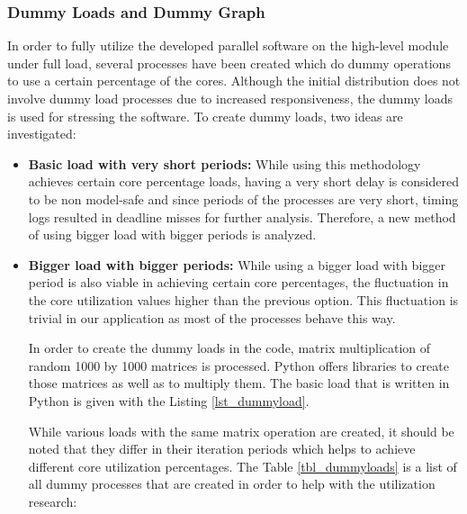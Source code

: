 \subsubsection{Dummy Loads and Dummy Graph}
In order to fully utilize the developed parallel software on the high-level module under full load, several processes have been created which do dummy operations to use a certain percentage of the cores. Although the initial distribution does not involve dummy load processes due to increased responsiveness, the dummy loads is used for stressing the software. To create dummy loads, two ideas are investigated:
\begin{itemize}
	\item \textbf{Basic load with very short periods:} While using this methodology achieves certain core percentage loads, having a very short delay is considered to be non model-safe and since periods of the processes are very short, timing logs resulted in deadline misses for further analysis. Therefore, a new method of using bigger load with bigger periods is analyzed.
	
	\item \textbf{Bigger load with bigger periods:} While using a bigger load with bigger period is also viable in achieving certain core percentages, the fluctuation in the core utilization values higher than the previous option. This fluctuation is trivial in our application as most of the processes behave this way.
	
	
	
	In order to create the dummy loads in the code, matrix multiplication of random 1000 by 1000 matrices is processed. Python offers libraries to create those matrices as well as to multiply them. The basic load that is written in Python is given with the Listing \ref{lst_dummyload}.
	
	While various loads with the same matrix operation are created, it should be noted that they differ in their iteration periods which helps to achieve different core utilization percentages. The Table \ref{tbl_dummyloads} is a list of all dummy processes that are created in order to help with the utilization research:
	

\end{itemize}

